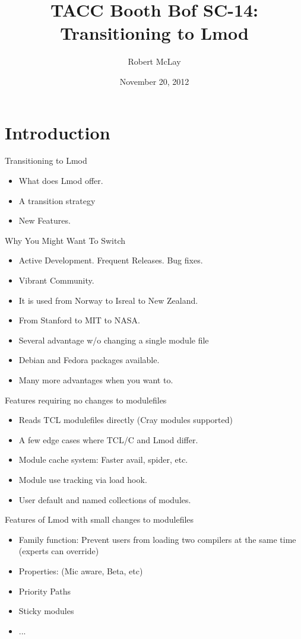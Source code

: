 \documentclass{beamer}
\title{TACC Booth Bof SC-14: Transitioning to Lmod}
\author{Robert McLay}
\institute{The Texas Advanced Computing Center}
\date{November 20, 2012}  %
\begin{document}
\begin{frame}
  \titlepage
\end{frame}

\section{Introduction}

\begin{frame}{Transitioning to Lmod}
  \begin{itemize}
    \item What does Lmod offer.
    \item A transition strategy
    \item New Features.
  \end{itemize}
\end{frame}


\begin{frame}{Why You Might Want To Switch}
  \begin{itemize}
    \item Active Development.  Frequent Releases. Bug fixes.
    \item Vibrant Community.
    \item It is used from Norway to Isreal to New Zealand.
    \item From Stanford to MIT to NASA.
    \item Several advantage w/o changing a single module file
    \item Debian and Fedora packages available.
    \item Many more advantages when you want to.
  \end{itemize}
\end{frame}

\begin{frame}{Features requiring no changes to modulefiles}
  \begin{itemize}
    \item Reads TCL modulefiles directly (Cray modules supported)
    \item A few edge cases where TCL/C and Lmod differ.
    \item Module cache system: Faster avail, spider, etc.
    \item Module use tracking via load hook.
    \item User default and named collections of modules.
  \end{itemize}
\end{frame}

\begin{frame}{Features of Lmod with small changes to modulefiles}
  \begin{itemize}
    \item Family function: Prevent users from loading two compilers at
      the same time (experts can override)
    \item Properties: (Mic aware, Beta, etc)
    \item Priority Paths
    \item Sticky modules
    \item ...
  \end{itemize}
\end{frame}
\end{document}
